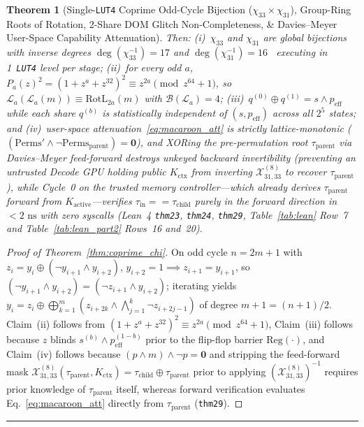 \documentclass[10pt,twocolumn]{article}
\makeatletter
\newif\ifspecintwocol \specintwocolfalse
\newif\ifspecresume   \specresumefalse
\newcommand{\StartTwoCol}{%
  \if@twocolumn
    \let\spec@next\@empty
  \else
    \ifspecintwocol
      \let\spec@next\@empty
    \else
      \global\specintwocoltrue
      \def\spec@next{\begin{multicols}{2}}%
    \fi
  \fi
  \spec@next
}
\newcommand{\EndConnesPlate}{%
  \par\vspace{3pt}\noindent\textcolor{black!25}{\rule{\textwidth}{0.4pt}}\par\vspace{4pt}%
  \ifspecresume
    \global\specresumefalse
    \let\spec@platepost\StartTwoCol
  \else
    \let\spec@platepost\@empty
  \fi
  \spec@platepost
}
\theoremstyle{spectralthm}
\newtheorem{theorem}{Theorem}[section]
\makeatother
\begin{document}
\begin{theorem}[Single-\texttt{LUT4} Coprime Odd-Cycle Bijection ($\chi_{33} \times \chi_{31}$), Group-Ring Roots of Rotation, 2-Share DOM Glitch Non-Completeness, \& Davies--Meyer User-Space Capability Attenuation]
Then: (i)~$\chi_{33}$ and $\chi_{31}$ are global bijections with inverse degrees $\deg(\chi_{33}^{-1}) = 17$ and $\deg(\chi_{31}^{-1}) = 16$~\cite{daemen1995cipher} executing in 1~\texttt{LUT4} level per stage; (ii)~for every odd $a$, $P_a(z)^2 = (1 + z^a + z^{32})^2 \equiv z^{2a} \pmod{z^{64}+1}$, so $\mathcal{L}_a(\mathcal{L}_a(m)) \equiv \mathrm{RotL}_{2a}(m)$ with $\mathcal{B}(\mathcal{L}_a) = 4$; (iii)~$q^{(0)} \oplus q^{(1)} = s \wedge p_{\mathrm{eff}}$ while each share $q^{(b)}$ is statistically independent of $(s, p_{\mathrm{eff}})$ across all $2^5$ states; and (iv)~user-space attenuation~\eqref{eq:macaroon_att} is strictly lattice-monotonic ($(\mathrm{Perms}' \wedge \neg\mathrm{Perms}_{\mathrm{parent}}) = \mathbf{0}$), and XORing the pre-permutation root $\tau_{\mathrm{parent}}$ via Davies--Meyer feed-forward destroys unkeyed backward invertibility (preventing an untrusted Decode GPU holding public $K_{\mathrm{ctx}}$ from inverting $\mathcal{X}_{31,33}^{(8)}$ to recover $\tau_{\mathrm{parent}}$), while Cycle~0 on the trusted memory controller---which already derives $\tau_{\mathrm{parent}}$ forward from $K_{\mathrm{active}}$---verifies $\tau_{\mathrm{in}} == \tau_{\mathrm{child}}$ purely in the forward direction in $<2\text{~ns}$ with zero syscalls (Lean~4 \texttt{thm23}, \texttt{thm24}, \texttt{thm29}, Table~\ref{tab:lean} Row~7 and Table~\ref{tab:lean_part2} Rows~16 and~20).
\end{theorem}
\begin{proof}[Proof of Theorem~\ref{thm:coprime_chi}]
On odd cycle $n = 2m+1$ with $z_i = y_i \oplus (\neg y_{i+1} \wedge y_{i+2})$, $y_{i+2} = 1 \implies z_{i+1} = y_{i+1}$, so $(\neg y_{i+1} \wedge y_{i+2}) = (\neg z_{i+1} \wedge y_{i+2})$; iterating yields $y_i = z_i \oplus \bigoplus_{k=1}^m (z_{i+2k} \wedge \bigwedge_{j=1}^k \neg z_{i+2j-1})$ of degree $m+1 = (n+1)/2$. Claim~(ii) follows from $(1+z^a+z^{32})^2 \equiv z^{2a} \pmod{z^{64}+1}$, Claim~(iii) follows because $z$ blinds $s^{(b)} \wedge p_{\mathrm{eff}}^{(1-b)}$ prior to the flip-flop barrier $\mathrm{Reg}(\cdot)$, and Claim~(iv) follows because $(p \wedge m) \wedge \neg p = \mathbf{0}$ and stripping the feed-forward mask $\mathcal{X}_{31,33}^{(8)}(\tau_{\mathrm{parent}}, K_{\mathrm{ctx}}) = \tau_{\mathrm{child}} \oplus \tau_{\mathrm{parent}}$ prior to applying $(\mathcal{X}_{31,33}^{(8)})^{-1}$ requires prior knowledge of $\tau_{\mathrm{parent}}$ itself, whereas forward verification evaluates Eq.~\eqref{eq:macaroon_att} directly from $\tau_{\mathrm{parent}}$ (\texttt{thm29}).
\end{proof}
\EndConnesPlate
\end{document}
